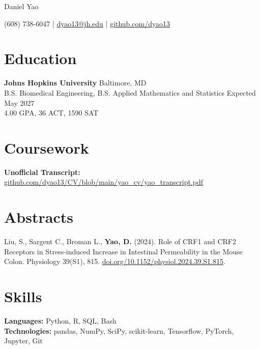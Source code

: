 \documentclass[11pt]{article}       %
\begin{document}
\centerline{\Huge Daniel Yao}

\vspace{5pt}

\centerline{(608) 738-6047 | \href{mailto:dyao13@jh.edu}{dyao13@jh.edu} | \href{https://github.com/dyao13/}{github.com/dyao13}}

\vspace{-9pt}

\section*{Education}

\textbf{Johns Hopkins University} \hfill Baltimore, MD \\
B.S. Biomedical Engineering, B.S. Applied Mathematics and Statistics \hfill Expected May 2027 \\
4.00 GPA, 36 ACT, 1590 SAT

\vspace{-9pt}

\section*{Coursework}
\textbf{Unofficial Transcript:} \href{https://github.com/dyao13/CV/blob/main/yao_cv/yao_transcript.pdf}{github.com/dyao13/CV/blob/main/yao\_cv/yao\_transcript.pdf}

\vspace{-9pt}

\section*{Abstracts}
Liu, S., Sargent C., Broman L., \textbf{Yao, D.} (2024). Role of CRF1 and CRF2 Receptors in Stress-induced Increase in Intestinal Permeability in the Mouse Colon. Physiology 39(S1), 815. \href{https://doi.org/10.1152/physiol.2024.39.S1.815}{doi.org/10.1152/physiol.2024.39.S1.815}.

\vspace{-9pt}

\section*{Skills}
\textbf{Languages:} Python, R, SQL, Bash \\
\textbf{Technologies:} pandas, NumPy, SciPy, scikit-learn, Tensorflow, PyTorch, Jupyter, Git
\end{document}
